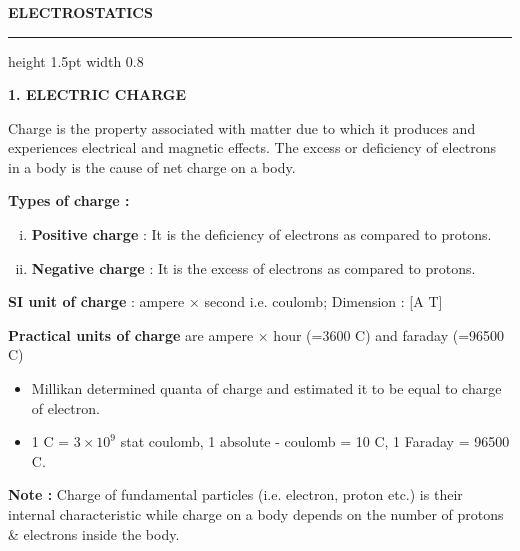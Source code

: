 \begin{frame}[t]
	\frametitle{}
	
	\noindent
	\begin{center}
		\Large\bfseries ELECTROSTATICS \\
		\vspace{0.3em}
		\hrule height 1.5pt width 0.8\textwidth
	\end{center}
	
	\vspace{1em}
	
	\noindent
	\textbf{1. ELECTRIC CHARGE}
	
	\vspace{0.5em}
	
	\noindent
	\small
	Charge is the property associated with matter due to which it produces and experiences electrical and magnetic effects. The excess or deficiency of electrons in a body is the cause of net charge on a body.
	
	\vspace{0.5em}
	
	\noindent
	\textbf{Types of charge :}
	
	\begin{enumerate}[(i)]
		\item \textbf{Positive charge} : It is the deficiency of electrons as compared to protons.
		\item \textbf{Negative charge} : It is the excess of electrons as compared to protons.
	\end{enumerate}
	
	\vspace{0.5em}
	
	\noindent
	\textbf{SI unit of charge} : ampere × second i.e. coulomb; Dimension : [A T]
	
	\vspace{0.2em}
	
	\noindent
	\textbf{Practical units of charge} are ampere × hour (=3600 C) and faraday (=96500 C)
	
	\vspace{0.7em}
	
	\begin{itemize}
		\item Millikan determined quanta of charge and estimated it to be equal to charge of electron.
		\item 1 C = $3 \times 10^9$ stat coulomb, 1 absolute - coulomb = 10 C, 1 Faraday = 96500 C.
	\end{itemize}
	
	\vspace{0.5em}
	
	\noindent
	\textbf{Note :} Charge of fundamental particles (i.e. electron, proton etc.) is their internal characteristic while charge on a body depends on the number of protons \& electrons inside the body.
	
\end{frame}
